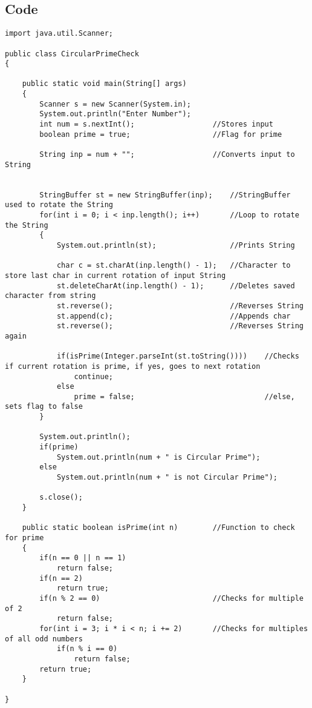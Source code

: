 \documentclass[ProgramminAssignment.tex]{subfiles}
\begin{document}
\subsection{Code}
\begin{lstlisting}
import java.util.Scanner;

public class CircularPrimeCheck
{

	public static void main(String[] args)
	{
		Scanner s = new Scanner(System.in);
		System.out.println("Enter Number");
		int num = s.nextInt();					//Stores input
		boolean prime = true;					//Flag for prime
		
		String inp = num + "";					//Converts input to String
		
		
		StringBuffer st = new StringBuffer(inp);	//StringBuffer used to rotate the String
		for(int i = 0; i < inp.length(); i++)		//Loop to rotate the String
		{	
			System.out.println(st);					//Prints String
			
			char c = st.charAt(inp.length() - 1);	//Character to store last char in current rotation of input String
			st.deleteCharAt(inp.length() - 1);		//Deletes saved character from string
			st.reverse();							//Reverses String	
			st.append(c);							//Appends char
			st.reverse();							//Reverses String again
			
			if(isPrime(Integer.parseInt(st.toString())))	//Checks if current rotation is prime, if yes, goes to next rotation
				continue;
			else
				prime = false;								//else, sets flag to false
		}
		
		System.out.println();
		if(prime)
			System.out.println(num + " is Circular Prime");
		else
			System.out.println(num + " is not Circular Prime");
		
		s.close();
	}
	
	public static boolean isPrime(int n)		//Function to check for prime
	{
		if(n == 0 || n == 1)
			return false;
		if(n == 2)
			return true;	
		if(n % 2 == 0)							//Checks for multiple of 2
			return false;
		for(int i = 3; i * i < n; i += 2)		//Checks for multiples of all odd numbers
			if(n % i == 0)
				return false;
		return true;
	}

}
\end{lstlisting}
\end{document}
